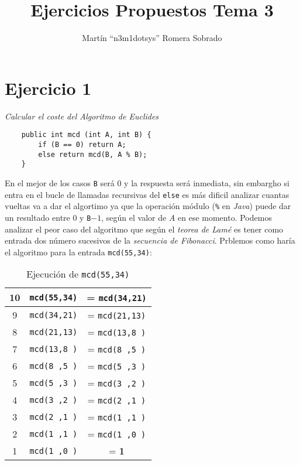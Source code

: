 \documentclass[a4paper, 12pt]{article}
\begin{document}
    \title{\textbf{Ejercicios Propuestos Tema 3}}
    \author{Martín ``n3m1dotsys'' Romera Sobrado}
    \maketitle

    \section{Ejercicio 1}

        \textit{Calcular el coste del Algoritmo de Euclides}

        \begin{verbatim}
    public int mcd (int A, int B) {
        if (B == 0) return A;
        else return mcd(B, A % B);
    }
        \end{verbatim}

        En el mejor de los casos \texttt{B} será $0$ y la respuesta será 
        inmediata, sin embargho si entra en el bucle de llamadas recursivas del 
        \texttt{else} es más dificil analizar cuantas vueltas va a dar el 
        algortimo ya que la operación módulo (\texttt{\%} en \textit{Java}) 
        puede dar un resultado entre $0$ y \texttt{B}$-1$, según el valor de 
        $A$ en ese momento. Podemos analizar el peor caso del algoritmo que 
        según el \textit{teorea de Lamé} es tener como entrada dos número 
        sucesivos de la \textit{secuencia de Fibonacci}. Prblemos como 
        haría el algoritmo para la entrada \texttt{mcd(55,34)}:
        
        \begin{table}[ht!]
            \centering
            \begin{tabular}{|c|c|c|}
                \hline
                10 & \texttt{mcd(55,34)} & = \texttt{mcd(34,21)} \\\hline
                9  & \texttt{mcd(34,21)} & = \texttt{mcd(21,13)} \\\hline
                8  & \texttt{mcd(21,13)} & = \texttt{mcd(13,8 )} \\\hline
                7  & \texttt{mcd(13,8 )} & = \texttt{mcd(8 ,5 )} \\\hline
                6  & \texttt{mcd(8 ,5 )} & = \texttt{mcd(5 ,3 )} \\\hline
                5  & \texttt{mcd(5 ,3 )} & = \texttt{mcd(3 ,2 )} \\\hline
                4  & \texttt{mcd(3 ,2 )} & = \texttt{mcd(2 ,1 )} \\\hline
                3  & \texttt{mcd(2 ,1 )} & = \texttt{mcd(1 ,1 )} \\\hline
                2  & \texttt{mcd(1 ,1 )} & = \texttt{mcd(1 ,0 )} \\\hline
                1  & \texttt{mcd(1 ,0 )} & = \textbf{1} \\\hline
            \end{tabular}
            \caption{Ejecución de \texttt{mcd(55,34)}}
        \end{table}
\end{document}
